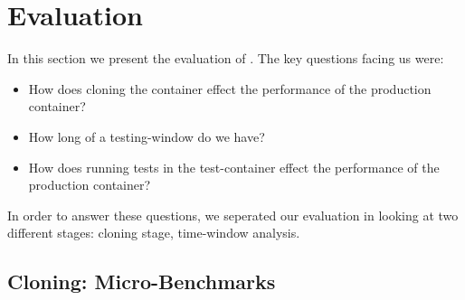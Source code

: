 \section{Evaluation}
\label{sec:evaluation}
In this section we present the evaluation of \parikshan. 
The key questions facing us were:
\begin{itemize}
     \item How does cloning the container effect the performance of the production container?
     \item How long of a testing-window do we have? 
   \item How does running tests in the test-container effect the performance of the production container?
\end{itemize}

In order to answer these questions, we seperated our evaluation in looking at two different stages: cloning stage, time-window analysis.

\subsection{Cloning: Micro-Benchmarks}
\label{sec:performance}

